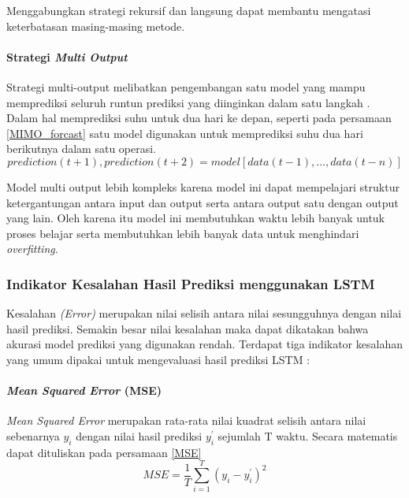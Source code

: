 \documentclass[../thesis.tex]{subfiles}
\begin{document}
Menggabungkan strategi rekursif dan langsung dapat membantu mengatasi keterbatasan masing-masing metode.

\paragraph{Strategi \textit{Multi Output}}

Strategi multi-output melibatkan pengembangan satu model yang mampu memprediksi seluruh runtun prediksi yang diinginkan dalam satu langkah \cite{Forecast_Strategy}.
Dalam hal memprediksi suhu untuk dua hari ke depan, seperti pada persamaan \ref{MIMO_forcast} satu model digunakan untuk memprediksi suhu dua hari berikutnya dalam satu operasi.
\begin{equation} \label{MIMO_forcast}
		prediction(t+1), prediction(t+2) = model[data(t-1), ..., data(t-n)]
\end{equation}

Model multi output lebih kompleks karena model ini dapat mempelajari struktur ketergantungan antara input dan output serta antara output satu dengan output yang lain.
Oleh karena itu model ini membutuhkan waktu lebih banyak untuk proses belajar serta membutuhkan lebih banyak data untuk menghindari \textit{overfitting}.

\subsubsection{Indikator Kesalahan Hasil Prediksi menggunakan LSTM}
Kesalahan \textit{(Error)} merupakan nilai selisih antara nilai sesungguhnya dengan nilai hasil prediksi. Semakin besar nilai kesalahan maka dapat dikatakan bahwa akurasi model prediksi 
yang digunakan rendah. Terdapat tiga indikator kesalahan yang umum dipakai untuk mengevaluasi hasil prediksi LSTM \cite{LSTM_2}:

\paragraph{\textit{Mean Squared Error}  (MSE)} 

\textit{Mean Squared Error} merupakan rata-rata nilai kuadrat selisih antara nilai sebenarnya $y_i$ dengan nilai hasil prediksi $y^{'}_i$ sejumlah T waktu. Secara matematis dapat dituliskan pada persamaan \ref{MSE}
\begin{equation}\label{MSE}
	MSE = \frac {1}{T}\sum \limits_{i=1}^{T} {(y_i - y^{'}_i)^2}
\end{equation}
\end{document}
